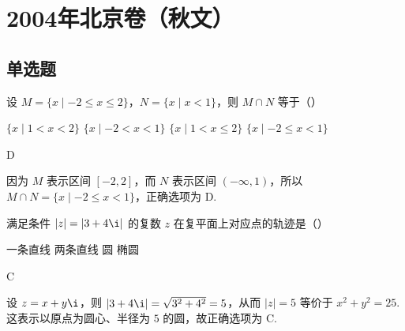 \chapter{2004年北京卷（秋文）}
\section{单选题}
\begin{problem}
设 \(M=\{x\mid -2\leqslant x\leqslant 2\}\)，\(N=\{x\mid x<1\}\)，则 \(M\cap N\) 等于（\quad）

\choices
    {\(\{x\mid 1<x<2\}\)}
    {\(\{x\mid -2<x<1\}\)}
    {\(\{x\mid 1<x\leqslant 2\}\)}
    {\(\{x\mid -2\leqslant x<1\}\)}
\begin{answer}
D
\end{answer}

\begin{solution}
因为 \(M\) 表示区间 \([-2,2]\)，而 \(N\) 表示区间 \((-\infty,1)\)，所以
\(M\cap N=\{x\mid -2\leqslant x<1\}\)，正确选项为 D.
\end{solution}

\end{problem}

\begin{problem}
满足条件 \(\left|z\right|=\left|3+4\i\right|\) 的复数 \(z\) 在复平面上对应点的轨迹是（\quad）

\choices
    {一条直线}
    {两条直线}
    {圆}
    {椭圆}
\begin{answer}
C
\end{answer}

\begin{solution}
设 \(z=x+y\i\)，则
\(\left\lvert 3+4\i\right\rvert=\sqrt{3^{2}+4^{2}}=5\)，从而
\(\left\lvert z\right\rvert=5\) 等价于 \(x^{2}+y^{2}=25\). 这表示以原点为圆心、半径为 \(5\) 的圆，故正确选项为 C.
\end{solution}

\end{problem}


